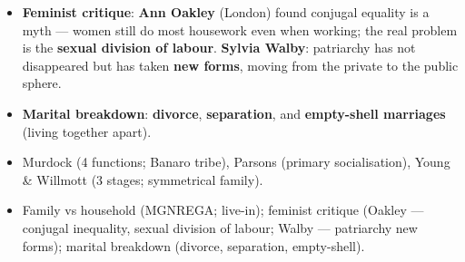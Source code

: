 \begin{KeyConcept}
\begin{itemize}
\item \textbf{Feminist critique}: \textbf{Ann Oakley} (London) found conjugal equality is a myth --- women still do most housework even when working; the real problem is the \textbf{sexual division of labour}. \textbf{Sylvia Walby}: patriarchy has not disappeared but has taken \textbf{new forms}, moving from the private to the public sphere.
\item \textbf{Marital breakdown}: \textbf{divorce}, \textbf{separation}, and \textbf{empty-shell marriages} (living together apart).
\end{itemize}
\end{KeyConcept}

\begin{QuickRevision}
\begin{itemize}
\item Murdock (4 functions; Banaro tribe), Parsons (primary socialisation), Young \& Willmott (3 stages; symmetrical family).
\item Family vs household (MGNREGA; live-in); feminist critique (Oakley --- conjugal inequality, sexual division of labour; Walby --- patriarchy new forms); marital breakdown (divorce, separation, empty-shell).
\end{itemize}
\end{QuickRevision}
